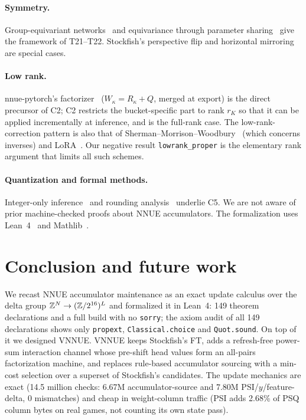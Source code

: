 \paragraph{Symmetry.}
Group-equivariant networks~\cite{cohen2016} and equivariance through parameter sharing~\cite{ravanbakhsh2017} give the framework of T21--T22.
Stockfish's perspective flip and horizontal mirroring are special cases.

\paragraph{Low rank.}
nnue-pytorch's factorizer~\cite{nnuepytorchdocs} ($W_\kappa=R_\kappa+Q$, merged at export) is the direct precursor of C2; C2 restricts the bucket-specific part to rank $r_K$ so that it can be applied incrementally at inference, and  is the full-rank case.
The low-rank-correction pattern is also that of Sherman--Morrison--Woodbury~\cite{sherman1950,woodbury1950} (which concerns inverses) and LoRA~\cite{hu2022lora}.
Our negative result \texttt{lowrank\_proper} is the elementary rank argument that limits all such schemes.

\paragraph{Quantization and formal methods.}
Integer-only inference~\cite{jacob2018} and rounding analysis~\cite{higham2002} underlie C5.
We are not aware of prior machine-checked proofs about NNUE accumulators.
The formalization uses Lean~4~\cite{demoura2021} and Mathlib~\cite{mathlib2020}.

\section{Conclusion and future work}\label{sec:conclusion}

We recast NNUE accumulator maintenance as an exact update calculus over the delta group $\mathbb{Z}^N\to(\mathbb{Z}/2^{16})^L$ and formalized it in Lean~4: 149 theorem declarations and a full build with no \texttt{sorry}; the axiom audit of all 149 declarations shows only \texttt{propext}, \texttt{Classical.choice} and \texttt{Quot.sound}.
On top of it we designed VNNUE.
VNNUE keeps Stockfish's FT, adds a refresh-free power-sum interaction channel whose pre-shift head values form an all-pairs factorization machine, and replaces rule-based accumulator sourcing with a min-cost selection over a superset of Stockfish's candidates.
The update mechanics are exact (14.5 million checks: 6.67M accumulator-source and 7.80M PSI/$y$/feature-delta, 0 mismatches) and cheap in weight-column traffic (PSI adds 2.68\% of PSQ column bytes on real games, not counting its own state pass).

